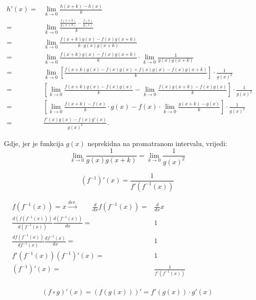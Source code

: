 \begin{align*}
    h'(x) =& \lim_{k\to 0} \frac{h(x+k)-h(x)}{k}\\
    =& \lim_{k\to 0} \frac{\frac{f(x+k)}{g(x+k)}-\frac{f(x)}{g(x)}}{k}\\
    =& \lim_{k\to 0} \frac{f(x+k)g(x)-f(x)g(x+k)}{k\cdot g(x)g(x+k)}\\
    =& \lim_{k\to 0} \frac{f(x+k)g(x)-f(x)g(x+k)}{k} \cdot \lim_{k\to 0}\frac{1}{g(x)g(x+k)}\\
    =& \lim_{k\to 0} \left[\frac{f(x+k)g(x) - f(x)g(x) + f(x)g(x) - f(x)g(x+k)}{k} \right] \cdot \frac{1}{g(x)^2} \\
    =& \left[\lim_{k\to 0} \frac{f(x+k)g(x) - f(x)g(x)}{k} - \lim_{k\to 0}\frac{f(x)g(x+k) - f(x)g(x)}{k} \right] \cdot \frac{1}{g(x)^2} \\
    =& \left[\lim_{k\to 0} \frac{f(x+k) - f(x)}{k} \cdot g(x) - f(x) \cdot \lim_{k\to 0}\frac{g(x+k) - g(x)}{k} \right] \cdot \frac{1}{g(x)^2} \\
    =& \frac{f'(x)g(x) - f(x)g'(x)}{g(x)^2}.
\end{align*}

Gdje, jer je funkcija $g(x)$ neprekidna na promatranom intervalu, vrijedi:
$$
\lim_{k\to 0}\frac{1}{g(x)g(x+k)} = \lim_{k\to 0}\frac{1}{g(x)^2}
$$

\begin{propositionbox}
    $$
        (f^{-1})'(x) = \frac{1}{f'(f^{-1}(x))}
    $$
\end{propositionbox}


\begin{align*}
    f(f^{-1}(x)) = x \xrightarrow{der.}\qquad \frac{d}{dx} f(f^{-1}(x)) =& \frac{d}{dx} x \phantom{f(f^{-1}(x)) = x \to\qquad}\\
    \frac{d\left( f(f^{-1}(x)) \right)}{d\left( f^{-1}(x) \right)} \frac{d\left(f^{-1}(x)\right)}{dx}
    =& 1 \\
    \frac{df(f^{-1}(x))}{df^{-1}(x)} \frac{df^{-1}(x)}{dx}
    =& 1 \\
    f'(f^{-1}(x))
    (f^{-1})'(x)
    =& 1\\
    (f^{-1})'(x)
    =& \frac{1}{f'(f^{-1}(x))}\\
\end{align*}

\begin{propositionbox}
    $$
        (f\circ g)'(x) = (f(g(x)))' = f'(g(x)) \cdot g'(x)
    $$
\end{propositionbox}

